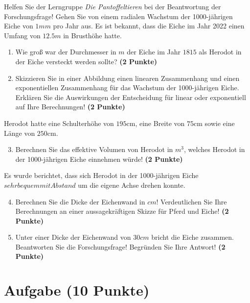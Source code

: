 \documentclass[a4paper, 9pt]{scrartcl}\usepackage[]{graphicx}\usepackage[]{xcolor}
\begin{document}
\vspace{1Ex}

Helfen Sie der Lerngruppe \textit{Die Pantoffeltieren} bei der Beantwortung der Forschungsfrage! Gehen Sie von einem radialen Wachstum der 1000-jährigen Eiche von $1mm$ pro Jahr aus. Es ist bekannt, dass die Eiche im Jahr 2022 einen Umfang von $12.5m$ in Brusthöhe hatte.

\begin{enumerate}
\item Wie groß war der Durchmesser in $m$ der Eiche im Jahr $1815$ als Herodot in der Eiche versteckt werden sollte? \textbf{(2 Punkte)}
\item Skizzieren Sie in einer Abbildung einen linearen Zusammenhang und einen exponentiellen Zusammenhang für das Wachstum der 1000-jährigen Eiche. Erklären Sie die Auswirkungen der Entscheidung für linear oder exponentiell auf Ihre Berechnungen! \textbf{(2 Punkte)}
\end{enumerate}
 
Herodot hatte eine Schulterhöhe von $195$cm, eine Breite von $75$cm sowie eine Länge von  $250$cm.

\begin{enumerate}
  \setcounter{enumi}{2}
\item Berechnen Sie das effektive Volumen von Herodot in $m^3$, welches Herodot in der 1000-jährigen Eiche einnehmen würde! \textbf{(2 Punkte)}
\end{enumerate}

Es wurde berichtet, dass sich Herodot in der 1000-jährigen Eiche $sehr bequem mit Abstand$ um die eigene Achse drehen konnte.

\begin{enumerate}
  \setcounter{enumi}{3}
\item Berechnen Sie die Dicke der Eichenwand in $cm$! Verdeutlichen Sie Ihre Berechnungen an einer aussagekräftigen Skizze für Pferd und Eiche! \textbf{(2 Punkte)} 
\item Unter einer Dicke der Eichenwand von $30cm$ bricht die Eiche zusammen. Beantworten Sie die Forschungsfrage! Begründen Sie Ihre Antwort! \textbf{(2 Punkte)} 
\end{enumerate}
 
\clearpage

\section{Aufgabe \hfill (10 Punkte)}
\end{document}
